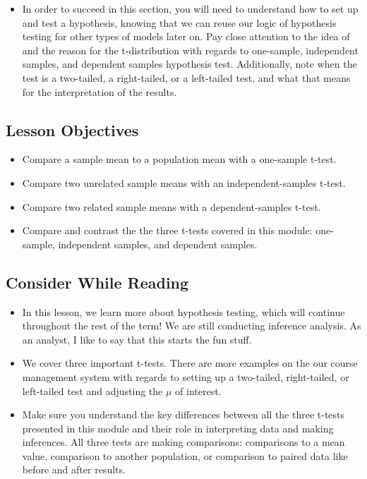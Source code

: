 \documentclass[
  letterpaper,
  DIV=11,
  numbers=noendperiod]{scrreprt}
\providecommand{\tightlist}{%
  \setlength{\itemsep}{0pt}\setlength{\parskip}{0pt}}\usepackage{longtable,booktabs,array}
\begin{document}
\begin{itemize}
\tightlist
\item
  In order to succeed in this section, you will need to understand how
  to set up and test a hypothesis, knowing that we can reuse our logic
  of hypothesis testing for other types of models later on. Pay close
  attention to the idea of and the reason for the t-distribution with
  regards to one-sample, independent samples, and dependent samples
  hypothesis test. Additionally, note when the test is a two-tailed, a
  right-tailed, or a left-tailed test, and what that means for the
  interpretation of the results.
\end{itemize}

\subsection{Lesson Objectives}\label{lesson-objectives-4}

\begin{itemize}
\tightlist
\item
  Compare a sample mean to a population mean with a one-sample t-test.
\item
  Compare two unrelated sample means with an independent-samples t-test.
\item
  Compare two related sample means with a dependent-samples t-test.
\item
  Compare and contrast the the three t-tests covered in this module:
  one-sample, independent samples, and dependent samples.
\end{itemize}

\subsection{Consider While Reading}\label{consider-while-reading-4}

\begin{itemize}
\tightlist
\item
  In this lesson, we learn more about hypothesis testing, which will
  continue throughout the rest of the term! We are still conducting
  inference analysis. As an analyst, I like to say that this starts the
  fun stuff.
\item
  We cover three important t-tests. There are more examples on the our
  course management system with regards to setting up a two-tailed,
  right-tailed, or left-tailed test and adjusting the \(\mu\) of
  interest.
\item
  Make sure you understand the key differences between all the three
  t-tests presented in this module and their role in interpreting data
  and making inferences. All three tests are making comparisons:
  comparisons to a mean value, comparison to another population, or
  comparison to paired data like before and after results.
\end{itemize}
\end{document}
